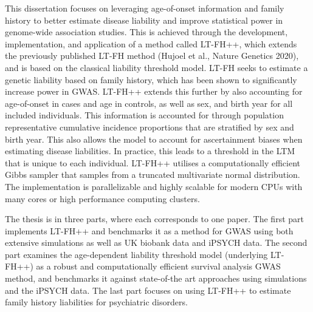 This dissertation focuses on leveraging age-of-onset information and family history to better estimate disease liability and improve statistical power in genome-wide association studies. This is achieved through the  development, implementation, and application of a method called LT-FH++, which extends the previously published LT-FH method (Hujoel et al., Nature Genetics 2020), and is based on the classical liability threshold model. LT-FH seeks to estimate a genetic liability based on family history, which has been shown to significantly increase power in GWAS. LT-FH++ extends this further by also accounting for age-of-onset in cases and age in controls, as well as sex, and birth year for all included individuals. This information is accounted for through population representative cumulative incidence proportions that are stratified by sex and birth year. This also allows the model to account for ascertainment biases when estimating disease liabilities. In practice, this leads to a threshold in the LTM that is unique to each individual. LT-FH++ utilises a computationally efficient Gibbs sampler that samples from a truncated multivariate normal distribution. The implementation is parallelizable and highly scalable for modern CPUs with many cores or high performance computing clusters. 

The thesis is in three parts, where each corresponds to one paper. The first part implements LT-FH++ and benchmarks it as a method for GWAS using both extensive simulations as well as UK biobank data and iPSYCH data. The second part examines the age-dependent liability threshold model (underlying LT-FH++) as a robust and computationally efficient survival analysis GWAS method, and benchmarks it against state-of-the art approaches using simulations and the iPSYCH data. The last part focuses on using LT-FH++ to estimate family history liabilities for psychiatric disorders. 
